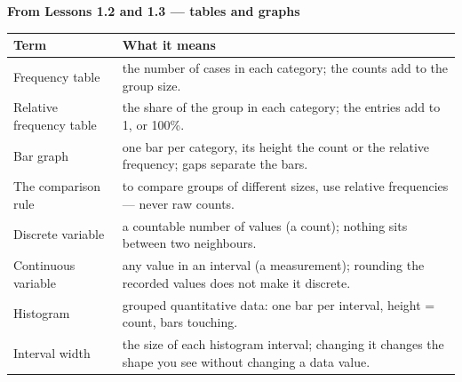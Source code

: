 \documentclass[12pt]{article}
\newcommand{\vocabhead}[1]{%
  \textbf{#1}\par\vspace{3pt}}
\begin{document}
\vspace{7pt}
\boxguard[9]
\vocabhead{From Lessons 1.2 and 1.3 --- tables and graphs}
\noindent\begin{tabularx}{\linewidth}{@{} l X @{}}
\rowcolor{sky}
\textbf{Term} & \textbf{What it means} \\
\midrule
Frequency table & the number of cases in each category; the counts add to the group size. \\
Relative frequency table & the share of the group in each category; the entries add to 1, or
                           100\%. \\
Bar graph & one bar per category, its height the count or the relative frequency; gaps separate
            the bars. \\
The comparison rule & to compare groups of different sizes, use relative frequencies --- never
                      raw counts. \\
Discrete variable & a countable number of values (a count); nothing sits between two
                    neighbours. \\
Continuous variable & any value in an interval (a measurement); rounding the recorded values
                      does not make it discrete. \\
Histogram & grouped quantitative data: one bar per interval, height = count, bars touching. \\
Interval width & the size of each histogram interval; changing it changes the shape you see
                 without changing a data value. \\
\end{tabularx}
\end{document}
